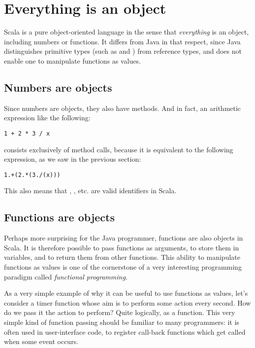 \documentclass[a4paper,12pt,twoside,titlepage]{article}
\newcommand{\langname}[1]{#1\xspace}
\newcommand{\Scala}{\langname{Scala}}
\newcommand{\Java}{\langname{Java}}
\begin{document}
\section{Everything is an object}
\label{sec:everything-an-object}

\Scala is a pure object-oriented language in the sense that
\emph{everything} is an object, including numbers or functions. It
differs from \Java in that respect, since \Java distinguishes
primitive types (such as  and ) from reference
types, and does not enable one to manipulate functions as values.

\subsection{Numbers are objects}
\label{sec:numbers-are-objects}

Since numbers are objects, they also have methods. And in fact, an
arithmetic expression like the following:
\begin{lstlisting}
1 + 2 * 3 / x
\end{lstlisting}
consists exclusively of method calls, because it is equivalent to the
following expression, as we saw in the previous section:
\begin{lstlisting}
1.+(2.*(3./(x)))
\end{lstlisting}
This also means that \code{+}, \code{*}, etc. are valid identifiers
in \Scala.

\subsection{Functions are objects}
\label{sec:funct-are-objects}

Perhaps more surprising for the \Java programmer, functions are also
objects in \Scala. It is therefore possible to pass functions as
arguments, to store them in variables, and to return them from other
functions. This ability to manipulate functions as values is one of
the cornerstone of a very interesting programming paradigm called
\emph{functional programming}.

As a very simple example of why it can be useful to use functions as
values, let's consider a timer function whose aim is to perform some
action every second. How do we pass it the action to perform? Quite
logically, as a function. This very simple kind of function passing
should be familiar to many programmers: it is often used in
user-interface code, to register call-back functions which get called
when some event occurs.
\end{document}
